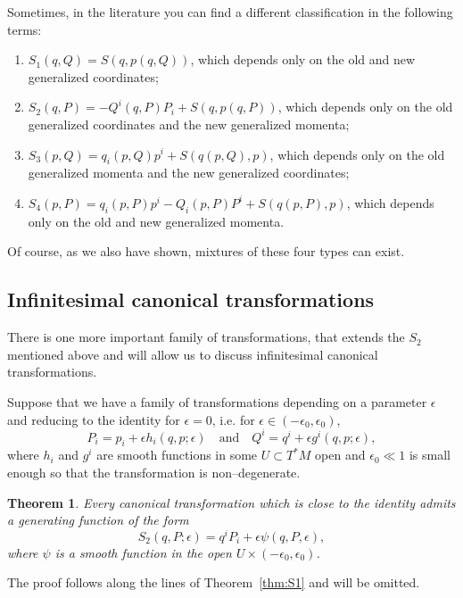 \documentclass[english,fontsize=11pt,paper=a5,oneside]{scrbook}
\newtheorem{theorem}{Theorem}[chapter]
\theoremstyle{definition}
\newenvironment{remark}
  {\pushQED{\qed}\renewcommand{\qedsymbol}{$\lozenge$}\remarkx}
  {\popQED\endremarkx}
\begin{document}
\begin{remark}
    Sometimes, in the literature you can find a different classification in the following terms:
    \begin{enumerate}
        \item $S_1(q,Q) = S(q,p(q,Q))$, which depends only on the old and new generalized coordinates;
        \item $S_2(q,P) = - Q^i(q,P) P_i + S(q,p(q,P))$, which depends only on the old generalized coordinates and the new generalized momenta;
        \item $S_3(p,Q) = q_i(p,Q) p^i + S(q(p,Q),p)$, which depends only on the old generalized momenta and the new generalized coordinates;
        \item $S_4(p,P) = q_i(p,P) p^i - Q_i(p,P) P^i + S(q(p,P),p)$, which depends only on the old and new generalized momenta.
    \end{enumerate}
    Of course, as we also have shown, mixtures of these four types can exist.
\end{remark}

\subsection{Infinitesimal canonical transformations}

There is one more important family of transformations, that extends the $S_2$ mentioned above and will allow us to discuss infinitesimal canonical transformations.

Suppose that we have a family of transformations depending on a parameter $\epsilon$ and reducing to the identity for $\epsilon = 0$, i.e. for $\epsilon \in (-\epsilon_0, \epsilon_0)$,
\begin{equation}\label{eq:infcantraf}
    P_i = p_i + \epsilon h_i(q,p;\epsilon) \quad\mbox{and}\quad
    Q^i = q^i + \epsilon g^i(q,p; \epsilon),
\end{equation}
where $h_i$ and $g^i$ are smooth functions in some $U\subset T^*M$ open and $\epsilon_0 \ll 1$ is small enough so that the transformation is non--degenerate.

\begin{theorem}
    Every canonical transformation which is close to the identity admits a generating function of the form
    \begin{equation}\label{eq:infS2}
        S_2(q, P; \epsilon) = q^i P_i + \epsilon \psi(q,P,\epsilon),
    \end{equation}
    where $\psi$ is a smooth function in the open $U\times(-\epsilon_0,\epsilon_0)$.
\end{theorem}
The proof follows along the lines of Theorem~\ref{thm:S1} and will be omitted.
\end{document}

